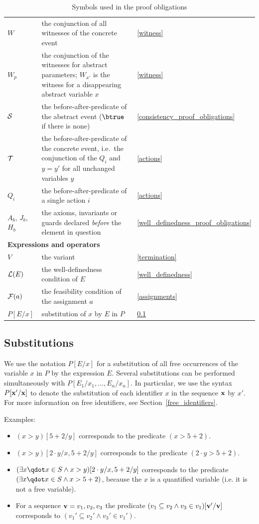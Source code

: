 \begin{table}[!ht]
\begin{tabular}{l p{} l}
  $W$ & the conjunction of all witnesses of the concrete event & \ref{witness} \\
  $W_p$ & the conjunction of the witnesses for abstract parameters; $W_{x'}$ is the witness for a disappearing abstract variable $x$ & \ref{witness} \\
  $\mathcal{S}$ & the before-after-predicate of the abstract event ($\btrue$ if there is none) & \ref{consistency_proof_obligations} \\
  $\mathcal{T}$ & the before-after-predicate of the concrete event, i.e.\ the conjunction of the $Q_i$ and $y=y'$ for all unchanged variables $y$ & \ref{actions} \\
  $Q_i$ & the before-after-predicate of a single action $i$ & \ref{actions} \\
  $A_b$, $J_b$, $H_b$ & the axioms, invariants or guards declared \emph{before} the element in question & \ref{well_definedness_proof_obligations} \\
  \hline
  \multicolumn{3}{l}{\textbf{Expressions and operators}} \\
  $V$ & the variant & \ref{termination} \\
  $\mathcal{L}(E)$ & the well-definedness condition of $E$ & \ref{well_definedness} \\
  $\mathcal{F}(a)$ & the feasibility condition of the assignment $a$ & \ref{assignments} \\
  $P[E/x]$ & substitution of $x$ by $E$ in $P$ & \ref{substitutions} \\
  \hline
\end{tabular}
\caption{Symbols used in the proof obligations}
\label{tab:po_notation}
\end{table}

\subsection{Substitutions}
\label{substitutions}
We use the notation $P[E/x]$ for a substitution of all free occurrences of the variable $x$ in
$P$ by the expression $E$.
Several substitutions can be performed simultaneously with $P[E_1/x_1,\ldots,E_n/x_n]$.
In particular, we use the syntax $P[\mathbf{x}'/\mathbf{x}]$ to denote the substitution of
each identifier $x$ in the sequence $\mathbf{x}$ by $x'$.
For more information on free identifiers, see Section~\ref{free_identifiers}.

Examples:
\begin{itemize}
\item $(x>y)[5+2/y]$ corresponds to the predicate $(x>5+2)$.
\item $(x>y)[2\cdot y/x,5+2/y]$ corresponds to the predicate $(2\cdot y>5+2)$.
\item $(\exists x \qdot x\in S \land x>y)[2\cdot y/x,5+2/y]$ corresponds to the predicate
  $(\exists x \qdot x\in S \land x>5+2)$, because the $x$ is a quantified variable 
  (i.e. it is not a free variable).
\item For a sequence $\mathbf{v}=v_1,v_2,v_3$ the predicate 
  $(v_1\subseteq v_2\land v_3\in v_1)[\mathbf{v}'/\mathbf{v}]$  corresponds to
  $(v_1'\subseteq v_2'\land v_3'\in v_1')$.
\end{itemize}



